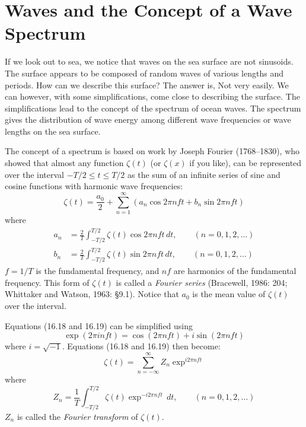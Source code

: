 \section{Waves and the Concept of a Wave Spectrum}
If we look out to sea, we notice that waves on the sea surface are
not sinusoids. The surface appears to be composed of  random waves of various lengths
and periods. How can we describe this surface? The answer is, Not very easily. We can
however, with some simplifications, come close to describing the surface. The simplifications
lead to the concept of the spectrum of ocean waves. The spectrum gives the distribution of
wave energy among different wave frequencies or wave lengths on the sea surface.

The concept of a spectrum is based on work by Joseph Fourier (1768--1830), who
showed that almost any function $\zeta (t)$ (or $\zeta (x)$ if you like), can be
represented over the interval $-T/2 \le t \le T/2$ as the sum of an infinite
series of sine and cosine functions with harmonic wave frequencies:
\begin{equation}
\zeta (t) = \frac{a_0}{2} + \sum_{n=1}^{\infty} (a_n \cos 2\pi nft + b_n \sin
2\pi nft)
\end{equation}
where
\begin{subequations}
\begin{align}
a_n &= \frac{2}{T} \int_{-T/2}^{T/2} \zeta (t) \cos 2\pi nft \, dt, \qquad
(n=0,1,2,\ldots) \\
b_n &= \frac{2}{T} \int_{-T/2}^{T/2} \zeta (t) \sin 2\pi nft \, dt, \qquad
(n=0,1,2,\ldots)
\end{align}
\end{subequations}
$f = 1/ T$ is the fundamental frequency, and $nf$ are harmonics of the fundamental frequency. This form of $\zeta (t)$ is called a \textit{Fourier series} (Bracewell, 1986: 204; Whittaker and Watson, 1963: \S 9.1). Notice that $a_0$ is the mean value of $\zeta (t)$ over the interval.

Equations (16.18 and 16.19) can be simplified using
\begin{equation}
\exp (2\pi inft) = \cos (2\pi nft) + i \sin (2\pi nft)
\end{equation}
where $i = \sqrt{-1}$. Equations (16.18 and 16.19) then become:
\begin{equation}
\zeta (t) = \sum_{n=-\infty}^{\infty} Z_n \exp ^{i2\pi nft}
\end{equation}
where
\begin{equation}
Z_n = \frac{1}{T} \int_{-T/2}^{T/2} \zeta (t) \exp ^{-i2\pi nft} \, dt, \qquad
(n=0,1,2,\ldots)
\end{equation}
$Z_n$ is called the \textit{Fourier
transform}  of $\zeta (t)$.

